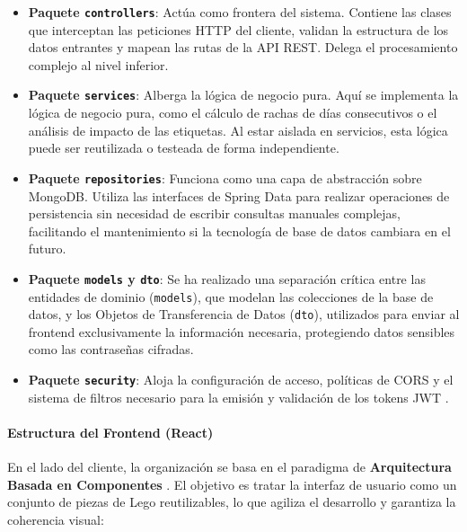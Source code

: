 \begin{itemize}
    \item \textbf{Paquete \texttt{controllers}}: Actúa como frontera del sistema. Contiene las clases que interceptan las peticiones HTTP del cliente, validan la estructura de los datos entrantes y mapean las rutas de la API REST. Delega el procesamiento complejo al nivel inferior.
    \item \textbf{Paquete \texttt{services}}: Alberga la lógica de negocio pura. Aquí se implementa la lógica de negocio pura, como el cálculo de rachas de días consecutivos o el análisis de impacto de las etiquetas. Al estar aislada en servicios, esta lógica puede ser reutilizada o testeada de forma independiente.
    \item \textbf{Paquete \texttt{repositories}}: Funciona como una capa de abstracción sobre MongoDB. Utiliza las interfaces de Spring Data para realizar operaciones de persistencia sin necesidad de escribir consultas manuales complejas, facilitando el mantenimiento si la tecnología de base de datos cambiara en el futuro.
    \item \textbf{Paquete \texttt{models} y \texttt{dto}}: Se ha realizado una separación crítica entre las entidades de dominio (\texttt{models}), que modelan las colecciones de la base de datos, y los Objetos de Transferencia de Datos (\texttt{dto}), utilizados para enviar al frontend exclusivamente la información necesaria, protegiendo datos sensibles como las contraseñas cifradas.
    \item \textbf{Paquete \texttt{security}}: Aloja la configuración de acceso, políticas de CORS \cite{bib:cors} y el sistema de filtros necesario para la emisión y validación de los tokens JWT \cite{bib:jwt}.
\end{itemize}

\paragraph{Estructura del Frontend (React)}

En el lado del cliente, la organización se basa en el paradigma de \textbf{Arquitectura Basada en Componentes} \cite{bib:clean_architecture}. El objetivo es tratar la interfaz de usuario como un conjunto de piezas de Lego reutilizables, lo que agiliza el desarrollo y garantiza la coherencia visual:

